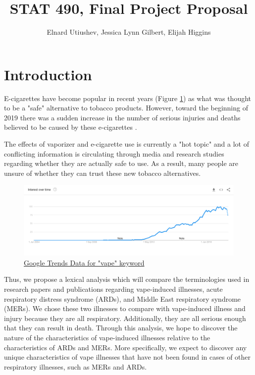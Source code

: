 \documentclass[article]{article}
\title{STAT 490, Final Project Proposal}
\author{Elnard Utiushev, Jessica Lynn Gilbert, Elijah Higgins}
\begin{document}
\maketitle

\tableofcontents




\section{Introduction}

E-cigarettes have become popular in recent years (Figure \ref{fig:vape_trend}) as what was thought to be a "safe" alternative to tobacco products. However, toward the beginning of 2019 there was a sudden increase in the number of serious injuries and deaths believed to be caused by these e-cigarettes \cite{doi:10.1056/NEJMoa1911614}.
 
The effects of vaporizer and e-cigarette use is currently a "hot topic" and a lot of conflicting information is circulating through media and research studies regarding whether they are actually safe to use. As a result, many people are unsure of whether they can trust these new tobacco alternatives.

\begin{figure}[H]
    \centering
    \includegraphics[width=\columnwidth]{google_trends_vape.png}
    \caption{\href{https://trends.google.com/trends/explore?date=all&geo=US&q=vape}{Google Trends Data for "vape" keyword} \cite{google_trends}}
    \label{fig:vape_trend}
\end{figure}

Thus, we propose a lexical analysis which  will compare the terminologies used in research papers and publications regarding vape-induced illnesses, acute respiratory distress syndrome (ARDs), and Middle East respiratory syndrome (MERs). We chose these two illnesses to compare with vape-induced illness and injury because they are all respiratory. Additionally, they are all serious enough that they can result in death. Through this analysis, we hope to discover the nature of the characteristics of vape-induced illnesses relative to the characteristics of ARDs and MERs. More specifically, we expect to discover any unique characteristics of vape illnesses that have not been found in cases of other respiratory illnesses, such as MERs and ARDs.
\end{document}
